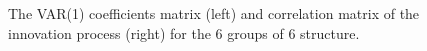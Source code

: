 \documentclass[
  11pt,
  letterpaper,
  DIV=11,
  numbers=noendperiod,
  titlepage]{scrartcl}
\begin{document}
\begin{figure}


\caption{\label{fig-settings-6x6}The VAR(1) coefficients matrix (left)
and correlation matrix of the innovation process (right) for the 6
groups of 6 structure.}

\end{figure}%
\end{document}

